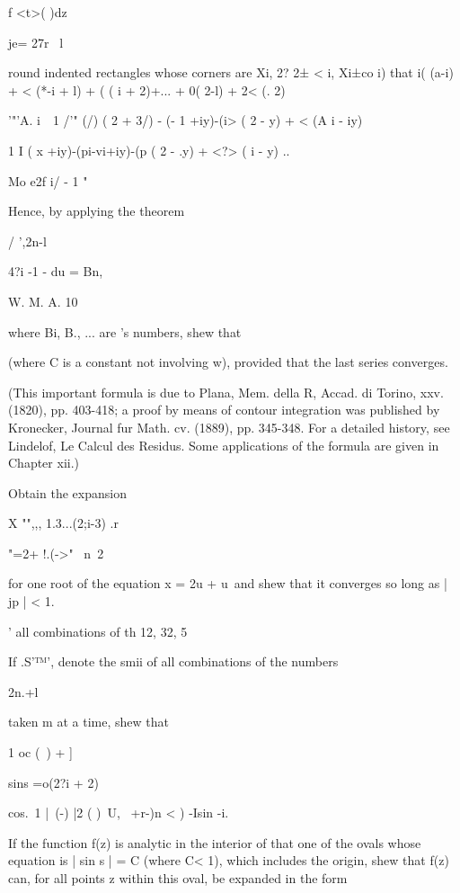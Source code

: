 \begin{wandwmiscexamples}
\begin{wandwmiscexample}
    f <t>( )dz

    je= 27r \ l

    round indented rectangles whose corners are Xi, 2? 2± < i, Xi±co i)
    that i( (a-i) + < (*-i + l) + ( ( i + 2)+... + 0( 2-l) + 2< (. 2)

    '"'A. i~\, 1 /'" (/) ( 2 + 3/) - (- 1 +iy)-(i> ( 2 - y) + < (A i -
    iy)

    1 I ( x +iy)-(pi-vi+iy)-(p ( 2 - .y) + <?> ( i - y) ..

    Mo e2f i/ - 1  "

    Hence, by applying the theorem

    / ',2n-l

    4?i -1 - du = Bn,

    W. M. A. 10


    where Bi, B., ... are \Bernoulli's numbers, shew that

    (where C is a constant not involving w), provided that the last series
    converges.

    (This important formula is due to Plana, Mem. della R, Accad. di
    Torino, xxv. (1820), pp. 403-418; a proof by means of contour
    integration was published by Kronecker, Journal fur Math. cv. (1889),
    pp. 345-348. For a detailed history, see Lindelof, Le Calcul des
    Residus. Some applications of the formula are given in Chapter xii.)
  \end{wandwmiscexample}
  \begin{wandwmiscexample}
    Obtain the expansion

    X "",,, 1.3...(2;i-3) .r

    "=2+ !.(->"~ n\ 2

    for one root of the equation x = 2u + u\ and shew that it converges so
    long as | jp | < 1.

    ' all combinations of th 12, 32, 5%
  \end{wandwmiscexample}
  \begin{wandwmiscexample}
    If .S'™', denote the smii of all combinations of the numbers

    2n.+l

    taken m at a time, shew that

    1 oc (\ ) + ]

    sins =o(2?i + 2)

    cos.\ 1 |\ (-) |2 ( )\ U, \ +r-)n < ) -Isin -i.

  \end{wandwmiscexample}
  \begin{wandwmiscexample}
    If the function f(z) is analytic in the interior of that one of
    the ovals whose equation is | sin s | = C (where C< 1), which includes
    the origin, shew that f(z) can, for all points z within this oval, be
    expanded in the form


\end{wandwmiscexample}
\end{wandwmiscexamples}
